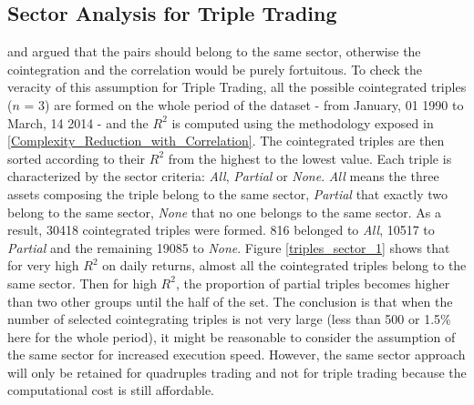 \documentclass[11pt,a4,twosided,singlespacing,titlepagenumber=on]{scrreprt}
\numberwithin{equation}{chapter} %
\theoremstyle{remark}
\begin{document}
\subsection{Sector Analysis for Triple Trading}
\cite{chan2009} and \cite{dunis2010} argued that the pairs should belong to the same sector, otherwise the cointegration and the correlation would be purely fortuitous. To check the veracity of this assumption for Triple Trading, all the possible cointegrated triples ($n$ = 3) are formed on the whole period of the dataset  - from January, 01 1990 to March, 14 2014 - and the $R^2$ is computed using the methodology exposed in \ref{Complexity_Reduction_with_Correlation}. The cointegrated triples are then sorted according to their $R^2$ from the highest to the lowest value. Each triple is characterized by the sector criteria: \textit{All}, \textit{Partial} or \textit{None}. \textit{All} means the three assets composing the triple belong to the same sector, \textit{Partial} that exactly two belong to the same sector, \textit{None} that no one belongs to the same sector. As a result, 30418 cointegrated triples were formed. 816 belonged to \textit{All}, 10517 to \textit{Partial} and the remaining 19085 to \textit{None}. Figure \ref{triples_sector_1} shows that for very high $R^2$ on daily returns, almost all the cointegrated triples belong to the same sector. Then for high $R^2$, the proportion of partial triples becomes higher than two other groups until the half of the set. The conclusion is that when the number of selected cointegrating triples is not very large (less than 500 or 1.5\% here for the whole period), it might be reasonable to consider the assumption of the same sector for increased execution speed. However, the same sector approach will only be retained for quadruples trading and not for triple trading because the computational cost is still affordable.
\end{document}
